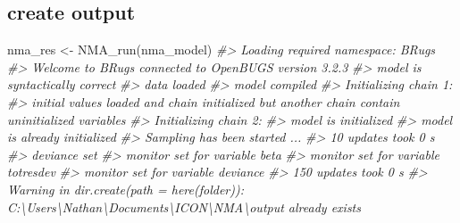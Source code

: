 \documentclass[
]{article}
\newenvironment{Shaded}{\begin{snugshade}}{\end{snugshade}}
\newcommand{\CommentTok}[1]{\textcolor[rgb]{0.56,0.35,0.01}{\textit{#1}}}
\newcommand{\FunctionTok}[1]{\textcolor[rgb]{0.00,0.00,0.00}{#1}}
\newcommand{\NormalTok}[1]{#1}
\newcommand{\OtherTok}[1]{\textcolor[rgb]{0.56,0.35,0.01}{#1}}
\begin{document}
\hypertarget{create-output}{%
\subsection{create output}\label{create-output}}

\begin{Shaded}
\begin{Highlighting}[]
\NormalTok{nma\_res }\OtherTok{\textless{}{-}} \FunctionTok{NMA\_run}\NormalTok{(nma\_model)}
\CommentTok{\#\textgreater{} Loading required namespace: BRugs}
\CommentTok{\#\textgreater{} Welcome to BRugs connected to OpenBUGS version 3.2.3}
\CommentTok{\#\textgreater{} model is syntactically correct}
\CommentTok{\#\textgreater{} data loaded}
\CommentTok{\#\textgreater{} model compiled}
\CommentTok{\#\textgreater{} Initializing chain 1:}
\CommentTok{\#\textgreater{} initial values loaded and chain initialized but another chain contain uninitialized variables}
\CommentTok{\#\textgreater{} Initializing chain 2:}
\CommentTok{\#\textgreater{} model is initialized}
\CommentTok{\#\textgreater{} model is already initialized}
\CommentTok{\#\textgreater{} Sampling has been started ...}
\CommentTok{\#\textgreater{} 10 updates took 0 s}
\CommentTok{\#\textgreater{} deviance set}
\CommentTok{\#\textgreater{} monitor set for variable \textquotesingle{}beta\textquotesingle{}}
\CommentTok{\#\textgreater{} monitor set for variable \textquotesingle{}totresdev\textquotesingle{}}
\CommentTok{\#\textgreater{} monitor set for variable \textquotesingle{}deviance\textquotesingle{}}
\CommentTok{\#\textgreater{} 150 updates took 0 s}
\CommentTok{\#\textgreater{} Warning in dir.create(path = here(folder)): \textquotesingle{}C:\textbackslash{}Users\textbackslash{}Nathan\textbackslash{}Documents\textbackslash{}ICON\textbackslash{}NMA\textbackslash{}output\textquotesingle{} already exists}


\end{Highlighting}
\end{Shaded}
\end{document}
